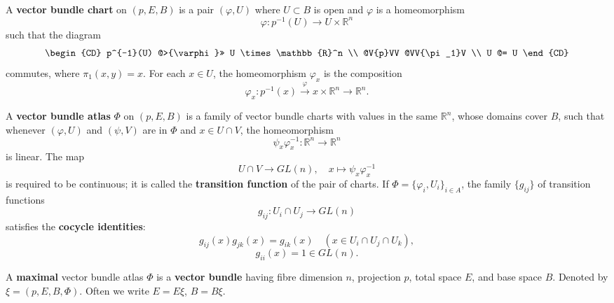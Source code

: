A \textbf{vector bundle chart} on $(p, E, B)$ is a pair $(\varphi, U)$ where $U \subset B$ is open and $\varphi$ is a homeomorphism
$$\varphi: p^{-1}(U) \to U \times \mathbb{R}^n$$
such that the diagram
\[
\begin{CD}
p^{-1}(U) @>{\varphi}>> U \times \mathbb{R}^n \\
@V{p}VV @VV{\pi_1}V \\
U @= U
\end{CD}
\]
commutes, where $\pi_1(x, y) = x$. For each $x \in U$, the homeomorphism $\varphi_x$ is the composition
$$\varphi_x: p^{-1}(x) \xrightarrow{\varphi} x \times \mathbb{R}^n \to \mathbb{R}^n.$$

A \textbf{vector bundle atlas} $\Phi$ on $(p, E, B)$ is a family of vector bundle charts with values in the same $\mathbb{R}^n$, whose domains cover $B$, such that whenever $(\varphi, U)$ and $(\psi, V)$ are in $\Phi$ and $x \in U \cap V$, the homeomorphism
$$\psi_x \varphi_x^{-1}: \mathbb{R}^n \to \mathbb{R}^n$$
is linear. The map
$$U \cap V \to GL(n), \quad x \mapsto \psi_x \varphi_x^{-1}$$
is required to be continuous; it is called the \textbf{transition function} of the pair of charts. If $\Phi = \{\varphi_i, U_i\}_{i \in A}$, the family $\{g_{ij}\}$ of transition functions
$$g_{ij}: U_i \cap U_j \to GL(n)$$
satisfies the \textbf{cocycle identities}:
$$g_{ij}(x)g_{jk}(x) = g_{ik}(x) \quad (x \in U_i \cap U_j \cap U_k),$$
$$g_{ii}(x) = 1 \in GL(n).$$

A \textbf{maximal} vector bundle atlas $\Phi$ is a \textbf{vector bundle} having fibre dimension $n$, projection $p$, total space $E$, and base space $B$. Denoted by $\xi = (p, E, B, \Phi)$. Often we write $E = E\xi$, $B = B\xi$.
